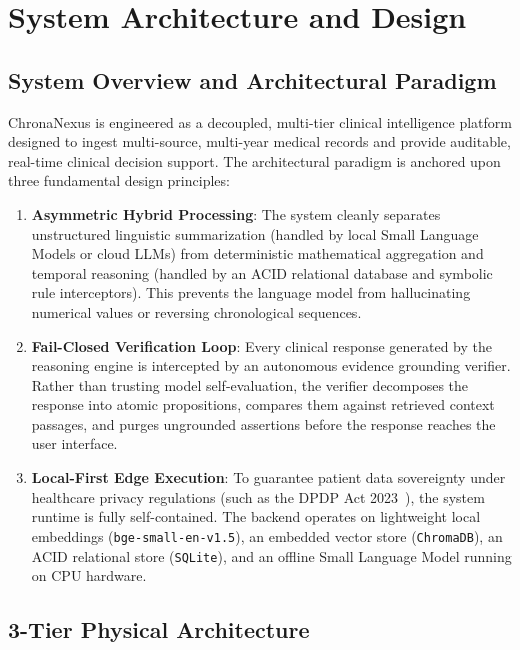 \chapter{System Architecture and Design}
\label{chap:system_architecture}

\section{System Overview and Architectural Paradigm}
\label{sec:arch_overview}

ChronaNexus is engineered as a decoupled, multi-tier clinical intelligence platform designed to ingest multi-source, multi-year medical records and provide auditable, real-time clinical decision support. The architectural paradigm is anchored upon three fundamental design principles:
\begin{enumerate}
    \item \textbf{Asymmetric Hybrid Processing}: The system cleanly separates unstructured linguistic summarization (handled by local Small Language Models or cloud LLMs) from deterministic mathematical aggregation and temporal reasoning (handled by an ACID relational database and symbolic rule interceptors). This prevents the language model from hallucinating numerical values or reversing chronological sequences.
    \item \textbf{Fail-Closed Verification Loop}: Every clinical response generated by the reasoning engine is intercepted by an autonomous evidence grounding verifier. Rather than trusting model self-evaluation, the verifier decomposes the response into atomic propositions, compares them against retrieved context passages, and purges ungrounded assertions before the response reaches the user interface.
    \item \textbf{Local-First Edge Execution}: To guarantee patient data sovereignty under healthcare privacy regulations (such as the DPDP Act 2023~\cite{nha2022abdm}), the system runtime is fully self-contained. The backend operates on lightweight local embeddings (\texttt{bge-small-en-v1.5}), an embedded vector store (\texttt{ChromaDB}), an ACID relational store (\texttt{SQLite}), and an offline Small Language Model running on CPU hardware.
\end{enumerate}


\section{3-Tier Physical Architecture}
\label{sec:arch_3tier}

